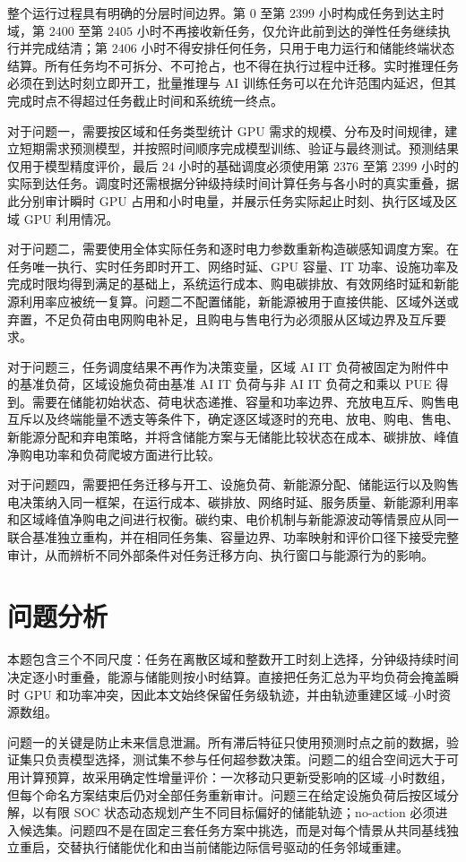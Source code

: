 \documentclass[withoutpreface,bwprint]{cumcmthesis}
\begin{document}
整个运行过程具有明确的分层时间边界。第 $0$ 至第 $2399$ 小时构成任务到达主时域，第 $2400$ 至第 $2405$ 小时不再接收新任务，仅允许此前到达的弹性任务继续执行并完成结清；第 $2406$ 小时不得安排任何任务，只用于电力运行和储能终端状态结算。所有任务均不可拆分、不可抢占，也不得在执行过程中迁移。实时推理任务必须在到达时刻立即开工，批量推理与 AI 训练任务可以在允许范围内延迟，但其完成时点不得超过任务截止时间和系统统一终点。

对于问题一，需要按区域和任务类型统计 GPU 需求的规模、分布及时间规律，建立短期需求预测模型，并按照时间顺序完成模型训练、验证与最终测试。预测结果仅用于模型精度评价，最后 $24$ 小时的基础调度必须使用第 $2376$ 至第 $2399$ 小时的实际到达任务。调度时还需根据分钟级持续时间计算任务与各小时的真实重叠，据此分别审计瞬时 GPU 占用和小时电量，并展示任务实际起止时刻、执行区域及区域 GPU 利用情况。

对于问题二，需要使用全体实际任务和逐时电力参数重新构造碳感知调度方案。在任务唯一执行、实时任务即时开工、网络时延、GPU 容量、IT 功率、设施功率及完成时限均得到满足的基础上，系统运行成本、购电碳排放、有效网络时延和新能源利用率应被统一复算。问题二不配置储能，新能源被用于直接供能、区域外送或弃置，不足负荷由电网购电补足，且购电与售电行为必须服从区域边界及互斥要求。

对于问题三，任务调度结果不再作为决策变量，区域 AI IT 负荷被固定为附件中的基准负荷，区域设施负荷由基准 AI IT 负荷与非 AI IT 负荷之和乘以 PUE 得到。需要在储能初始状态、荷电状态递推、容量和功率边界、充放电互斥、购售电互斥以及终端能量不透支等条件下，确定逐区域逐时的充电、放电、购电、售电、新能源分配和弃电策略，并将含储能方案与无储能比较状态在成本、碳排放、峰值净购电功率和负荷爬坡方面进行比较。

对于问题四，需要把任务迁移与开工、设施负荷、新能源分配、储能运行以及购售电决策纳入同一框架，在运行成本、碳排放、网络时延、服务质量、新能源利用率和区域峰值净购电之间进行权衡。碳约束、电价机制与新能源波动等情景应从同一联合基准独立重构，并在相同任务集、容量边界、功率映射和评价口径下接受完整审计，从而辨析不同外部条件对任务迁移方向、执行窗口与能源行为的影响。

\section{问题分析}
本题包含三个不同尺度：任务在离散区域和整数开工时刻上选择，分钟级持续时间决定逐小时重叠，能源与储能则按小时结算。直接把任务汇总为平均负荷会掩盖瞬时 GPU 和功率冲突，因此本文始终保留任务级轨迹，并由轨迹重建区域--小时资源数组。

问题一的关键是防止未来信息泄漏。所有滞后特征只使用预测时点之前的数据，验证集只负责模型选择，测试集不参与任何超参数决策。问题二的组合空间远大于可用计算预算，故采用确定性增量评价：一次移动只更新受影响的区域--小时数组，但每个命名方案结束后仍对全部任务重新审计。问题三在给定设施负荷后按区域分解，以有限 SOC 状态动态规划产生不同目标偏好的储能轨迹；no-action 必须进入候选集。问题四不是在固定三套任务方案中挑选，而是对每个情景从共同基线独立重启，交替执行储能优化和由当前储能边际信号驱动的任务邻域重建。
\end{document}
